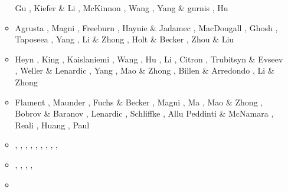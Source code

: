 \begin{itemize}
\begin{scriptsize}
\begin{itemize}
                    Gu \etal \cite{gulm16}, Kiefer \& Li \cite{kili16},
                    McKinnon \etal \cite{mcnw16}, Wang \etal \cite{wahz16},
                    Yang \& gurnis \cite{yagu16}, Hu \etal \cite{hulh16}
\item[\twothousandseventeen] Agrusta \etal \cite{aggv17}, Magni \etal \cite{maav17},
                       Freeburn \etal \cite{frbm17}, Haynie \& Jadamec \cite{haja17},
                       MacDougall \etal \cite{majf17}, Ghosh \etal \cite{ghts17},
                       Taposeea \etal \cite{taac17}, Yang \etal \cite{yagz17},
                       Li \& Zhong \cite{lizh17}, Holt \& Becker \cite{hobe17},
                       Zhou \& Liu \cite{zhli17}
\item[\twothousandeighteen] Heyn \etal \cite{hect18}, King \cite{king18},
                    Kaislaniemi \etal \cite{kavb18}, Wang \etal \cite{wavp18},
                    Hu \etal \cite{hulz18}, Li \etal \cite{lizo18},
                    Citron \etal \cite{cimt18}, Trubitsyn \& Evseev \cite{trev18},
                    Weller \& Lenardic \cite{wele18}, Yang \etal \cite{yagz18},
                    Mao \& Zhong \cite{mazh18}, Billen \& Arredondo \cite{biar18},
                    Li \& Zhong \cite{lizh19}
\item[\twothousandnineteen] Flament \cite{flam19}, Maunder \etal \cite{mavb19},
                    Fuchs \& Becker \cite{fube19}, Magni \cite{magn19}, 
                    Ma \etal \cite{malg19}, Mao \& Zhong \cite{mazh19},
                    Bobrov \& Baranov \cite{boba19}, Lenardic \etal \cite{lewh19},
                    Schliffke \etal \cite{scvm19}, Allu Peddinti \& McNamara \cite{almc19},
                    Reali \etal \cite{rejv19}, Huang \etal \cite{huzl19},
                    Paul \etal \cite{pagc19}
\item[\twothousandtwenty]    \textcite{weki20},  \textcite{braf20},  \textcite{pagh20},
                             \textcite{vamg20},  \textcite{heyg20}, 
                             \textcite{bill20},  \textcite{sele20},
                             \textcite{dazl20},  \textcite{wali20}, 
\item[\twothousandtwentyone] \textcite{cafm21},  \textcite{ligl21},
                             \textcite{scvg21},  \textcite{ligl21b},
                             \textcite{wali21}
\item[\twothousandtwentytwo] \textcite{limc22} 
\end{itemize}
\end{scriptsize}



\end{itemize}
